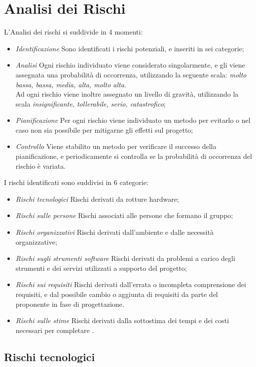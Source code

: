 \section{Analisi dei Rischi}
L'Analisi dei rischi si suddivide in 4 momenti:
\begin{itemize}
\item \textit{Identificazione} Sono identificati i rischi potenziali, e inseriti in sei categorie;
\item \textit{Analisi} Ogni rischio individuato viene considerato singolarmente, e gli viene assegnata una probabilità di occorrenza, utilizzando la seguente scala: \textit{molto bassa, bassa, media, alta, molto alta}. \\
Ad ogni rischio viene inoltre assegnato un livello di gravità, utilizzando la scala \textit{insignificante, tollerabile, serio, catastrofico};
\item \textit{Pianificazione} Per ogni rischio viene individuato un metodo per evitarlo o nel caso non sia possibile per mitigarne gli effetti sul progetto;
\item \textit{Controllo} Viene stabilito un metodo per verificare il successo della pianificazione, e periodicamente si controlla se la probabilità di occorrenza del rischio è variata.
\end{itemize}

I rischi identificati sono suddivisi in 6 categorie:
\begin{itemize}
\item \textit{Rischi tecnologici} Rischi derivati da rotture hardware;
\item \textit{Rischi sulle persone} Rischi associati alle persone che formano il gruppo;
\item \textit{Rischi organizzativi} Rischi derivati dall'ambiente e dalle necessità organizzative;
\item \textit{Rischi sugli strumenti software} Rischi derivati da problemi a carico degli strumenti e dei servizi utilizzati a supporto del progetto;
\item \textit{Rischi sui requisiti} Rischi derivati dall'errata o incompleta comprensione dei requisiti, e dal possibile cambio o aggiunta di requisiti da parte del proponente in fase di progettazione.
\item \textit{Rischi sulle stime} Rischi derivati dalla sottostima dei tempi e dei costi necessari per completare \ProjectName.
\end{itemize}

	\subsection{Rischi tecnologici}
	
